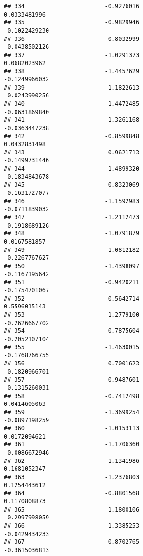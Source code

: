 \documentclass[
]{article}
\begin{document}
\begin{verbatim}
## 334                       -0.9276016                          0.0333481996
## 335                       -0.9829946                         -0.1022429230
## 336                       -0.8032999                         -0.0438502126
## 337                       -1.0291373                          0.0682023962
## 338                       -1.4457629                         -0.1249966032
## 339                       -1.1822613                         -0.0243990256
## 340                       -1.4472485                         -0.0631869840
## 341                       -1.3261168                         -0.0363447238
## 342                       -0.8599848                          0.0432831498
## 343                       -0.9621713                         -0.1499731446
## 344                       -1.4899320                         -0.1834843678
## 345                       -0.8323069                         -0.1631727077
## 346                       -1.1592983                         -0.0711839032
## 347                       -1.2112473                         -0.1918689126
## 348                       -1.0791879                          0.0167581857
## 349                       -1.0812182                         -0.2267767627
## 350                       -1.4398097                         -0.1167195642
## 351                       -0.9420211                         -0.1754701067
## 352                       -0.5642714                          0.5596015143
## 353                       -1.2779100                         -0.2626667702
## 354                       -0.7875604                         -0.2052107104
## 355                       -1.4630015                         -0.1768766755
## 356                       -0.7001623                         -0.1820966701
## 357                       -0.9487601                         -0.1315260031
## 358                       -0.7412498                          0.0414605063
## 359                       -1.3699254                         -0.0897198259
## 360                       -1.0153113                          0.0172094621
## 361                       -1.1706360                         -0.0086672946
## 362                       -1.1341986                          0.1681052347
## 363                       -1.2376803                          0.1254443612
## 364                       -0.8801568                          0.1170808873
## 365                       -1.1800106                         -0.2997998059
## 366                       -1.3385253                         -0.0429434233
## 367                       -0.8702765                         -0.3615036813

\end{verbatim}
\end{document}
